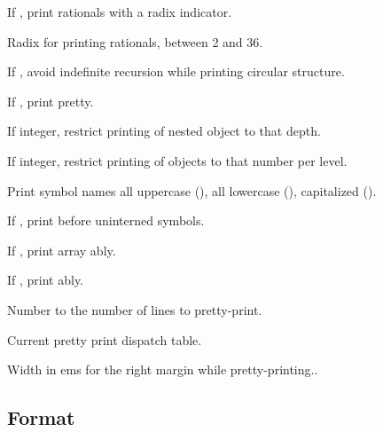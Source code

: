 \begin{LIST}{1cm}
  If \T, print rationals with a radix indicator.

  Radix for printing rationals, between 2 and 36.

  If \T, avoid indefinite recursion while printing circular
  structure. 

  If \T, print pretty.

  If integer, restrict printing of nested object to that depth.

  If integer, restrict printing of objects to that number per level.

  Print symbol names all uppercase (), all lowercase
  (), capitalized ().

  If \T, print \kwd{:\#} before uninterned symbols.

  If \T, print array ably.

  If \T, print ably.

  Number to the number of lines to pretty-print.


  Current pretty print dispatch table.

  Width in ems for the right margin while pretty-printing..

\end{LIST}



\subsection{Format}
\label{section:Format}


